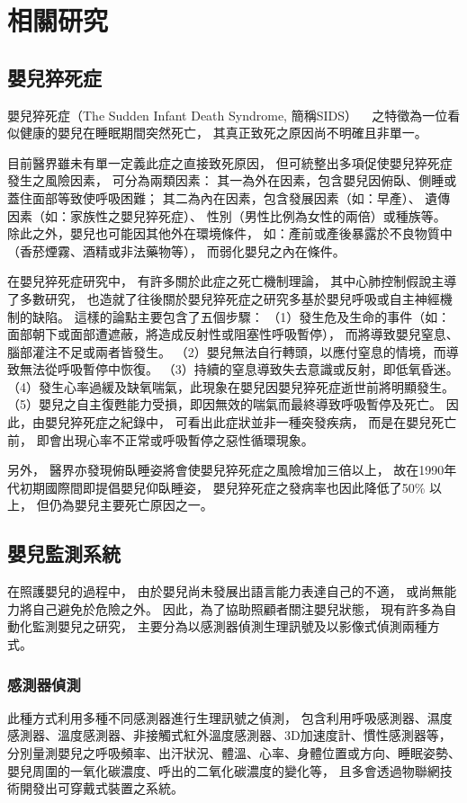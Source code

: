 \documentclass[class=NCU_thesis, crop=false]{standalone}
\begin{document}
\chapter{相關研究}

\section{嬰兒猝死症}
嬰兒猝死症（The Sudden Infant Death Syndrome, 簡稱SIDS）
~\cite{kinneyTheSuddenInfantDeathSyndrome2009}
之特徵為一位看似健康的嬰兒在睡眠期間突然死亡，
其真正致死之原因尚不明確且非單一。

目前醫界雖未有單一定義此症之直接致死原因，
但可統整出多項促使嬰兒猝死症發生之風險因素，
可分為兩類因素：
其一為外在因素，包含嬰兒因俯臥、側睡或蓋住面部等致使呼吸困難；
其二為內在因素，包含發展因素（如：早產）、
遺傳因素（如：家族性之嬰兒猝死症）、
性別（男性比例為女性的兩倍）或種族等。
除此之外，嬰兒也可能因其他外在環境條件，
如：產前或產後暴露於不良物質中（香菸煙霧、酒精或非法藥物等），
而弱化嬰兒之內在條件。

在嬰兒猝死症研究中，
有許多關於此症之死亡機制理論，
其中心肺控制假說主導了多數研究，
也造就了往後關於嬰兒猝死症之研究多基於嬰兒呼吸或自主神經機制的缺陷。
這樣的論點主要包含了五個步驟：
（1）發生危及生命的事件（如：面部朝下或面部遭遮蔽，將造成反射性或阻塞性呼吸暫停），
而將導致嬰兒窒息、腦部灌注不足或兩者皆發生。
（2）嬰兒無法自行轉頭，以應付窒息的情境，而導致無法從呼吸暫停中恢復。
（3）持續的窒息導致失去意識或反射，即低氧昏迷。
（4）發生心率過緩及缺氧喘氣，此現象在嬰兒因嬰兒猝死症逝世前將明顯發生。
（5）嬰兒之自主復甦能力受損，即因無效的喘氣而最終導致呼吸暫停及死亡。
因此，由嬰兒猝死症之紀錄中，
可看出此症狀並非一種突發疾病，
而是在嬰兒死亡前，
即會出現心率不正常或呼吸暫停之惡性循環現象。

另外，
醫界亦發現俯臥睡姿將會使嬰兒猝死症之風險增加三倍以上，
故在1990年代初期國際間即提倡嬰兒仰臥睡姿，
嬰兒猝死症之發病率也因此降低了50\% 以上，
但仍為嬰兒主要死亡原因之一。

\section{嬰兒監測系統}
在照護嬰兒的過程中，
由於嬰兒尚未發展出語言能力表達自己的不適，
或尚無能力將自己避免於危險之外。
因此，為了協助照顧者關注嬰兒狀態，
現有許多為自動化監測嬰兒之研究，
主要分為以感測器偵測生理訊號及以影像式偵測兩種方式。

\subsection{感測器偵測}
此種方式利用多種不同感測器進行生理訊號之偵測，
包含利用呼吸感測器、濕度感測器、溫度感測器、非接觸式紅外溫度感測器、3D加速度計、慣性感測器等，
分別量測嬰兒之呼吸頻率、出汗狀況、體溫、心率、身體位置或方向、睡眠姿勢、嬰兒周圍的一氧化碳濃度、呼出的二氧化碳濃度的變化等，
且多會透過物聯網技術開發出可穿戴式裝置之系統。
\end{document}
